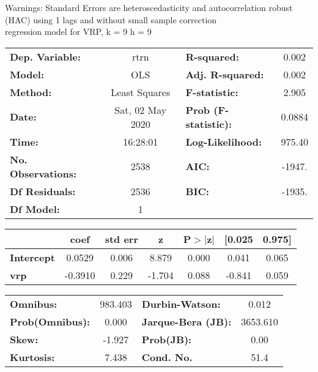 Warnings: \newline
 [1] Standard Errors are heteroscedasticity and autocorrelation robust (HAC) using 1 lags and without small sample correction\\ 

regression model for VRP, k = 9 h = 9\begin{center}
\begin{tabular}{lclc}
\toprule
\textbf{Dep. Variable:}    &       rtrn       & \textbf{  R-squared:         } &     0.002   \\
\textbf{Model:}            &       OLS        & \textbf{  Adj. R-squared:    } &     0.002   \\
\textbf{Method:}           &  Least Squares   & \textbf{  F-statistic:       } &     2.905   \\
\textbf{Date:}             & Sat, 02 May 2020 & \textbf{  Prob (F-statistic):} &   0.0884    \\
\textbf{Time:}             &     16:28:01     & \textbf{  Log-Likelihood:    } &    975.40   \\
\textbf{No. Observations:} &        2538      & \textbf{  AIC:               } &    -1947.   \\
\textbf{Df Residuals:}     &        2536      & \textbf{  BIC:               } &    -1935.   \\
\textbf{Df Model:}         &           1      & \textbf{                     } &             \\
\bottomrule
\end{tabular}
\begin{tabular}{lcccccc}
                   & \textbf{coef} & \textbf{std err} & \textbf{z} & \textbf{P$> |$z$|$} & \textbf{[0.025} & \textbf{0.975]}  \\
\midrule
\textbf{Intercept} &       0.0529  &        0.006     &     8.879  &         0.000        &        0.041    &        0.065     \\
\textbf{vrp}       &      -0.3910  &        0.229     &    -1.704  &         0.088        &       -0.841    &        0.059     \\
\bottomrule
\end{tabular}
\begin{tabular}{lclc}
\textbf{Omnibus:}       & 983.403 & \textbf{  Durbin-Watson:     } &    0.012  \\
\textbf{Prob(Omnibus):} &   0.000 & \textbf{  Jarque-Bera (JB):  } & 3653.610  \\
\textbf{Skew:}          &  -1.927 & \textbf{  Prob(JB):          } &     0.00  \\
\textbf{Kurtosis:}      &   7.438 & \textbf{  Cond. No.          } &     51.4  \\
\bottomrule
\end{tabular}
\end{center}

